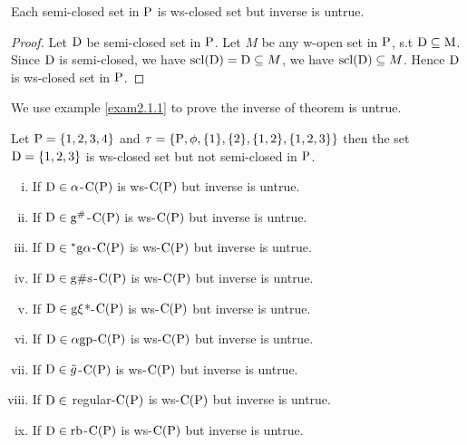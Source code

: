 \begin{thm}\label{thm2.1.1}
Each semi-closed set in $\mathrm{P}$ is ws-closed set but inverse is untrue.
\end{thm}

\begin{proof}
Let $\mathrm{D}$ be semi-closed set in $\mathrm{P}$. Let $M$ be any w-open set in $\mathrm{P}$, s.t $\mathrm{D}\subseteq \mathrm{M}$. Since $\mathrm{D}$ is semi-closed, we have $\mathrm{scl}(\mathrm{D}) = \mathrm{D} \subseteq M$, we have  $\mathrm{scl}(\mathrm{D}) \subseteq M$.   Hence $\mathrm{D}$ is ws-closed set in $\mathrm{P}$.
\end{proof}

We use example \ref{exam2.1.1} to prove the inverse of  theorem is untrue. 

\begin{exm}\label{exam2.1.1}
Let $\mathrm{P}= \{1, 2, 3, 4\}$ and  $\tau= \{\mathrm{P}, \phi, \{1\}, \{2\},\{1, 2\}, \{1, 2, 3\}\}$ then the set $\mathrm{D}= \{1,2,3\}$ is ws-closed set but not semi-closed in $\mathrm{P}$.  
\end{exm}

\begin{thm}\label{thm2.1.2}
\begin{enumerate}[(i)]
\item If $\mathrm{D}\in\alpha$-$\mathrm{C}(\mathrm{P})$ is ws-$\mathrm{C}(\mathrm{P})$ but inverse is untrue.

\item If $\mathrm{D}\in \mathrm{g}^{\#}$-$\mathrm{C}(\mathrm{P})$ is ws-$\mathrm{C}(\mathrm{P})$ but inverse is untrue.

\item If $\mathrm{D}\in {}^{*}\mathrm{g}\alpha$-$\mathrm{C}(\mathrm{P})$ is ws-$\mathrm{C}(\mathrm{P})$ but inverse is untrue.

\item If $\mathrm{D}\in \mathrm{g}\# \mathrm{s}$-$\mathrm{C}(\mathrm{P})$ is ws-$\mathrm{C}(\mathrm{P})$ but inverse is untrue.

\item If $\mathrm{D}\in \mathrm{g}\xi$*-$\mathrm{C}(\mathrm{P})$ is ws-$\mathrm{C}(\mathrm{P})$ but inverse is untrue.

\item If $\mathrm{D}\in \alpha\mathrm{g}\mathrm{p}$-$\mathrm{C}(\mathrm{P})$ is ws-$\mathrm{C}(\mathrm{P})$ but inverse is untrue.

\item If $\mathrm{D}\in \ddot{g}$-$\mathrm{C}(\mathrm{P})$ is ws-$\mathrm{C}(\mathrm{P})$ but inverse is untrue.

\item If $\mathrm{D}\in$ regular-$\mathrm{C}(\mathrm{P})$ is ws-$\mathrm{C}(\mathrm{P})$ but inverse is untrue.

\item If $\mathrm{D}\in \mathrm{r}\mathrm{b}$-$\mathrm{C}(\mathrm{P})$ is ws-$\mathrm{C}(\mathrm{P})$ but inverse is untrue.
\end{enumerate}
\end{thm}


